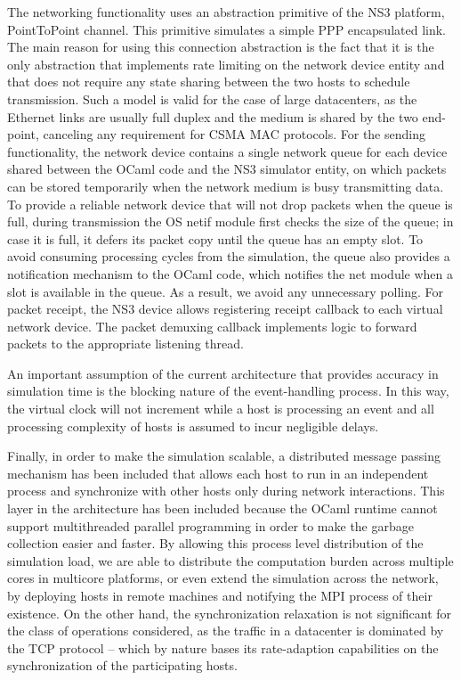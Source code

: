 The networking functionality uses an abstraction primitive of the NS3
platform, PointToPoint channel. This primitive simulates a simple PPP
encapsulated link. The main reason for using this connection
abstraction is the fact that it is the only abstraction that
implements rate limiting on the network device entity and that does
not require any state sharing between the two hosts to schedule
transmission. Such a model is valid for the case of large datacenters,
as the Ethernet links are usually full duplex and the medium is
shared by the two end-point, canceling any requirement for
CSMA MAC protocols. For the sending functionality, the network device
contains a single network queue for each device shared between the
OCaml code and the NS3 simulator entity, on which packets can be
stored temporarily when the network medium is busy transmitting
data. To provide a reliable network device that will not drop packets
when the queue is full, during transmission the OS netif module first
checks the size of the queue; in case it is full, it defers its
packet copy until the queue has an empty slot. To avoid
consuming processing cycles from the simulation, the queue also
provides a notification mechanism to the OCaml code, which notifies
the net module when a slot is available in the queue. As a result, we
avoid any unnecessary polling.  For packet receipt, the NS3 device allows
registering receipt callback to each virtual network
device. The packet demuxing callback implements logic to forward
packets to the appropriate listening thread.

An important assumption of the current architecture that provides accuracy in
simulation time is the blocking nature of the event-handling process. 
In this way,
the virtual clock will not increment while a host is processing an event and
all processing complexity of hosts is assumed to incur negligible delays. 

Finally, in order to make the simulation scalable, a distributed
message passing mechanism has been included that allows each host to
run in an independent process and synchronize with other hosts only
during network interactions.  This layer in the architecture has been
included because the OCaml runtime cannot support multithreaded
parallel programming in order to make the garbage collection easier
and faster. By allowing this process level distribution of the
simulation load, we are able to distribute the computation burden
across multiple cores in multicore platforms, or even extend the
simulation across the network, by deploying hosts in remote machines
and notifying the MPI process of their existence.  On the other hand,
the synchronization relaxation is not significant for the class of
operations considered, as the traffic in a datacenter is dominated by
the TCP protocol -- which by nature bases its rate-adaption
capabilities on the synchronization of the participating hosts.

